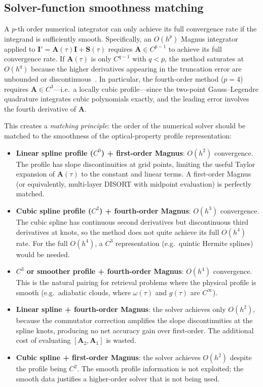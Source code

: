 \documentclass[11pt,a4paper]{article}
\newcommand{\vect}[1]{\bm{#1}}
\newcommand{\mat}[1]{\mathbf{#1}}
\theoremstyle{definition}
\begin{document}
\subsection{Solver-function smoothness matching}\label{sec:smoothness}

A $p$-th order numerical integrator can only achieve its full
convergence rate if the integrand is sufficiently smooth.
Specifically, an $O(h^p)$ Magnus integrator applied to
$\vect{I}'=\mat{A}(\tau)\vect{I}+\vect{S}(\tau)$ requires
$\mat{A}\in C^{p-1}$ to achieve its full convergence rate.  If
$\mat{A}(\tau)$ is only $C^{q-1}$ with $q<p$, the method saturates at
$O(h^q)$ because the higher derivatives appearing in the truncation
error are unbounded or
discontinuous~\cite{blanes2009,hairer2006}.  In particular, the
fourth-order method ($p\!=\!4$) requires $\mat{A}\in C^3$---i.e.\ a
locally cubic profile---since the two-point Gauss--Legendre quadrature
integrates cubic polynomials exactly, and the leading error involves the
fourth derivative of $\mat{A}$.

This creates a \emph{matching principle}: the order of the numerical
solver should be matched to the smoothness of the optical-property
profile representation:
\begin{itemize}[nosep]
\item \textbf{Linear spline profile ($C^0$) + first-order Magnus}:
  $O(h^2)$ convergence.  The profile has slope discontinuities at
  grid points, limiting the useful Taylor expansion of $\mat{A}(\tau)$
  to the constant and linear terms.  A first-order Magnus (or
  equivalently, multi-layer DISORT with midpoint evaluation) is
  perfectly matched.

\item \textbf{Cubic spline profile ($C^2$) + fourth-order Magnus}:
  $O(h^3)$ convergence.  The cubic spline has continuous second
  derivatives but discontinuous third derivatives at knots, so the
  method does not quite achieve its full $O(h^4)$ rate.
  For the full $O(h^4)$, a $C^3$ representation (e.g.\ quintic Hermite
  splines) would be needed.

\item \textbf{$C^3$ or smoother profile + fourth-order Magnus}:
  $O(h^4)$ convergence.  This is the natural pairing for retrieval
  problems where the physical profile is smooth (e.g.\ adiabatic
  clouds, where $\omega(\tau)$ and $g(\tau)$ are $C^\infty$).

\item \textbf{Linear spline + fourth-order Magnus}: the solver achieves
  only $O(h^2)$, because the commutator correction amplifies the slope
  discontinuities at the spline knots, producing no net accuracy gain
  over first-order.  The additional cost of evaluating
  $[\mat{A}_2,\mat{A}_1]$ is wasted.

\item \textbf{Cubic spline + first-order Magnus}: the solver achieves
  $O(h^2)$ despite the profile being $C^2$.  The smooth profile
  information is not exploited; the smooth data justifies a
  higher-order solver that is not being used.
\end{itemize}
\end{document}

